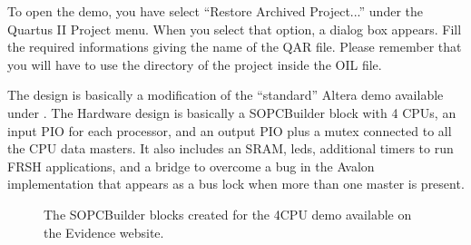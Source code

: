 To open the demo, you have select ``Restore Archived Project...''
under the Quartus II Project menu. When you select that option, a
dialog box appears. Fill the required informations giving the name of
the QAR file. Please remember that you will have to use the directory of the project inside the OIL file.

The design is basically a modification of the ``standard'' Altera demo
available under
. The
Hardware design is basically a SOPCBuilder block with 4 CPUs, an input
PIO for each processor, and an output PIO plus a mutex connected to
all the CPU data masters. It also includes an SRAM, leds, additional
timers to run FRSH applications, and a bridge to overcome a bug in the
Avalon implementation that appears as a bus lock when more than one
master is present.

\begin{figure}

\caption{\label{fig:tutorial_sopcbuilder_4cpu}The SOPCBuilder blocks created for the 4CPU demo available on the Evidence website.}
\end{figure}

